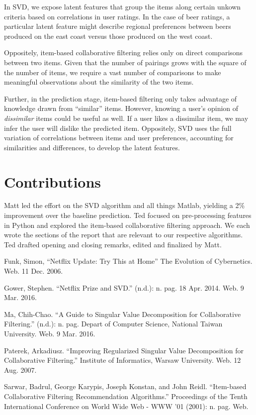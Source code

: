 \documentclass[12pt]{article}
\begin{document}
In SVD, we expose latent features that group the items along certain unkown criteria based on correlations in user ratings. In the case of beer ratings, a particular latent feature might describe regional preferences between beers produced on the east coast versus those produced on the west coast.

Oppositely, item-based collaborative filtering relies only on direct comparisons between two items. Given that the number of pairings grows with the square of the number of items, we require a vast number of comparisons to make meaningful observations about the similarity of the two items.

Further, in the prediction stage, item-based filtering only takes advantage of knowledge drawn from ``similar'' items. However, knowing a user's opinion of \textit{dissimilar} items could be useful as well. If a user likes a dissimilar item, we may infer the user will dislike the predicted item. Oppositely, SVD uses the full variation of correlations between items and user preferences, accounting for similarities and differences, to develop the latent features.

\section{Contributions}
Matt led the effort on the SVD algorithm and all things Matlab, yielding a 2\% improvement over the baseline prediction. Ted focused on pre-processing features in Python and explored the item-based collaborative filtering approach. We each wrote the sections of the report that are relevant to our respective algorithms. Ted drafted opening and closing remarks, edited and finalized by Matt.

\begin{thebibliography}{9}

Funk, Simon, ``Netflix Update: Try This at Home'' The Evolution of Cybernetics. Web. 11 Dec. 2006.

Gower, Stephen. ``Netflix Prize and SVD.'' (n.d.): n. pag. 18 Apr. 2014. Web. 9 Mar. 2016.

Ma, Chih-Chao. ``A Guide to Singular Value Decomposition for Collaborative Filtering.'' (n.d.): n. pag. Depart of Computer Science, National Taiwan University. Web. 9 Mar. 2016.

Paterek, Arkadiusz. ``Improving Regularized Singular Value Decomposition for Collaborative Filtering.'' Institute of Informatics, Warsaw University. Web. 12 Aug. 2007.

Sarwar, Badrul, George Karypis, Joseph Konstan, and John Reidl. ``Item-based Collaborative Filtering Recommendation Algorithms.'' Proceedings of the Tenth International Conference on World Wide Web - WWW '01 (2001): n. pag. Web.

\end{thebibliography}
\end{document}
